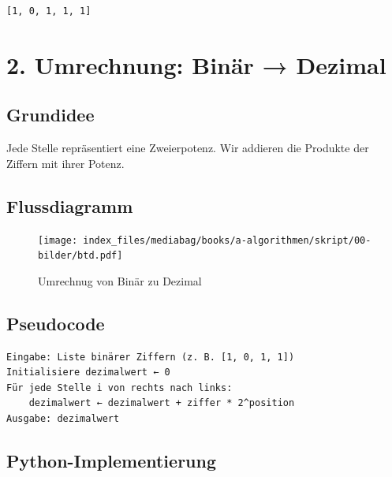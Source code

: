 \documentclass[
  letterpaper,
  DIV=11,
  numbers=noendperiod]{scrreprt}
\begin{document}
\begin{verbatim}
[1, 0, 1, 1, 1]
\end{verbatim}

\section{2. Umrechnung: Binär →
Dezimal}\label{umrechnung-binuxe4r-dezimal}

\subsection{Grundidee}\label{grundidee-2}

Jede Stelle repräsentiert eine Zweierpotenz. Wir addieren die Produkte
der Ziffern mit ihrer Potenz.

\subsection{Flussdiagramm}\label{flussdiagramm-1}

\begin{figure}[H]

{\centering \texttt{[image: index\_files/mediabag/books/a-algorithmen/skript/00-bilder/btd.pdf]}

}

\caption{Umrechnug von Binär zu Dezimal}

\end{figure}%

\subsection{Pseudocode}\label{pseudocode-1}

\begin{verbatim}
Eingabe: Liste binärer Ziffern (z. B. [1, 0, 1, 1])
Initialisiere dezimalwert ← 0
Für jede Stelle i von rechts nach links:
    dezimalwert ← dezimalwert + ziffer * 2^position
Ausgabe: dezimalwert
\end{verbatim}

\subsection{Python-Implementierung}\label{python-implementierung-1}
\end{document}
